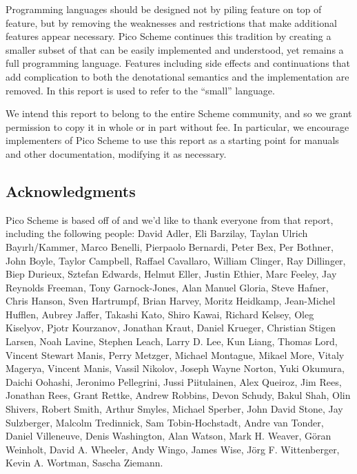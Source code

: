 
\label{historysection}

Programming languages should be designed not by piling feature on top
of feature, but by removing the weaknesses and restrictions that make
additional features appear necessary.  Pico Scheme continues this
tradition by creating a smaller subset of \rsevenrs{} that can be easily
implemented and understood, yet remains a full programming
language. Features including side effects and continuations that add
complication to both the denotational semantics and the implementation
are removed. In this report \rsevenrs{} is used to refer to the ``small''
language.



\medskip

We intend this report to belong to the entire Scheme community, and so
we grant permission to copy it in whole or in part without fee.  In
particular, we encourage implementers of Pico Scheme to use this report as
a starting point for manuals and other documentation, modifying it as
necessary.



\subsection*{Acknowledgments}

Pico Scheme is based off of \rsevenrs{} and we'd like to thank everyone from
that report, including the following people: David Adler, Eli
Barzilay, Taylan Ulrich Bay\i{}rl\i/Kammer, Marco Benelli, Pierpaolo
Bernardi, Peter Bex, Per Bothner, John Boyle, Taylor Campbell, Raffael
Cavallaro, William Clinger, Ray Dillinger, Biep Durieux, Sztefan
Edwards, Helmut Eller, Justin Ethier, Marc Feeley, Jay Reynolds
Freeman, Tony Garnock-Jones, Alan Manuel Gloria, Steve Hafner, Chris
Hanson, Sven Hartrumpf, Brian Harvey, Moritz Heidkamp, Jean-Michel
Hufflen, Aubrey Jaffer, Takashi Kato, Shiro Kawai, Richard Kelsey,
Oleg Kiselyov, Pjotr Kourzanov, Jonathan Kraut, Daniel Krueger,
Christian Stigen Larsen, Noah Lavine, Stephen Leach, Larry D. Lee, Kun
Liang, Thomas Lord, Vincent Stewart Manis, Perry Metzger, Michael
Montague, Mikael More, Vitaly Magerya, Vincent Manis, Vassil Nikolov,
Joseph Wayne Norton, Yuki Okumura, Daichi Oohashi, Jeronimo
Pellegrini, Jussi Piitulainen, Alex Queiroz, Jim Rees, Jonathan Rees,
Grant Rettke, Andrew Robbins, Devon Schudy, Bakul Shah, Olin Shivers,
Robert Smith, Arthur Smyles, Michael Sperber, John David Stone, Jay
Sulzberger, Malcolm Tredinnick, Sam Tobin-Hochstadt, Andre van Tonder,
Daniel Villeneuve, Denis Washington, Alan Watson, Mark H.  Weaver,
G\"oran Weinholt, David A. Wheeler, Andy Wingo, James Wise, J\"org
F. Wittenberger, Kevin A. Wortman, Sascha Ziemann.

